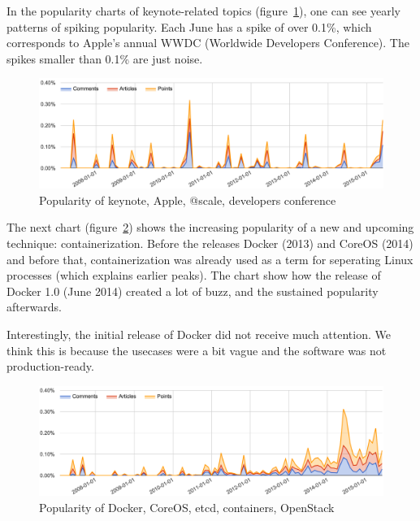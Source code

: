 In the popularity charts of keynote-related topics (figure~\ref{fig:trend_keynote}), one can see yearly patterns of spiking popularity. Each June has a spike of over 0.1\%, which corresponds to Apple's annual WWDC (Worldwide Developers Conference). The spikes smaller than 0.1\% are just noise.
\begin{figure}[H] %
	\caption{Popularity of keynote, Apple, @scale, developers conference}
	\label{fig:trend_keynote}
	\centering
	\includegraphics[width=14cm]{topic_trends/keynote_relative}
\end{figure}


The next chart (figure~\ref{fig:trend_docker}) shows the increasing popularity of a new and upcoming technique: containerization. Before the releases Docker (2013) and CoreOS (2014) and before that, containerization was already used as a term for seperating Linux processes (which explains earlier peaks). The chart show how the release of Docker 1.0 (June 2014) created a lot of buzz, and the sustained popularity afterwards.

Interestingly, the initial release of Docker did not receive much attention. We think this is because the usecases were a bit vague and the software was not production-ready.
\begin{figure}[H] %
	\caption{Popularity of Docker, CoreOS, etcd, containers, OpenStack}
	\label{fig:trend_docker}
	\centering
	\includegraphics[width=14cm]{topic_trends/docker_relative}
\end{figure}

